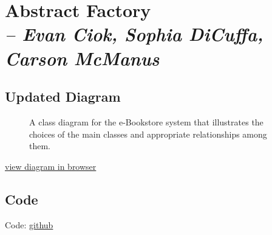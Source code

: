 \chapter{Abstract Factory \\
  \small{\textit{-- Evan Ciok, Sophia DiCuffa, Carson McManus}}
  \label{Chapter::AbstractFactory}}

\section{Updated Diagram}

\begin{figure}[htb]
  \centering
  \caption{\label{Figure::bookstoreUML} A class diagram for the e-Bookstore system that illustrates the choices of the main classes and
    appropriate relationships among them.}
\end{figure}

\href{https://mermaid.ink/svg/pako:eNrdVslq5DAQ_RWh04R05wM6IZcOAzkkNCQMzOBLRdbIIpZkZBmy9b-PFssjL-3omhhsi1dPtavsd0xUSfEOkxra9oYD0yAKiezlEXTgb29wK5mmJafS_ARilH5F74HjrnNENAVDH6Aj9MfZXHCjOlYtCfYVpe3ill-UMU7bJdGBNg3VSvJFjTWIiB8LmQZy_3s5lK8Xyb7iBJj6LuH4OEZuPxjNJUMSBL20XBNQ7y0q3TNBfXCodc8EDQEg4l8pbt1wZsVlau8JnqfBdmYMPKmXMdDYsOw9BnvHGTX31vdFmVFhcbK2zuM0Jd5UA_9NHVN-qEc-3yUgnz2U9LMtYXFiVlx9bLcnj9_6TrvRiz7Xv3ooooOPFZd73bUm9NJ2-3Ed2moQk-cV-aHuxKMSYFQ4U4Hgl4FwB7a0oGFZGpROYgrUCdi37xR1zTtNSazQVNAf1BSOWThVCnRxcd2bjm6s5HTGXldbx89KhtKBu6pyXMxc5ZMaZ9gZUpxrYrJhVfmoY7INTPoww07fDrkWRnTPi6dsGE9zWRwtM0kypGay8YhxLYo3WFAtgJf2t8TPnAKbigpa4J1d1pxVpsCFPFoidHaevkqCd0Z3dIO7pnTftfAbg3d_oW4tauOzkd31PzrutcENyD9KRc7xH_Gt4iY}{view diagram in browser}

\section{Code}

Code: \href{https://github.com/dyc3/ssw345-group-assignments}{github}